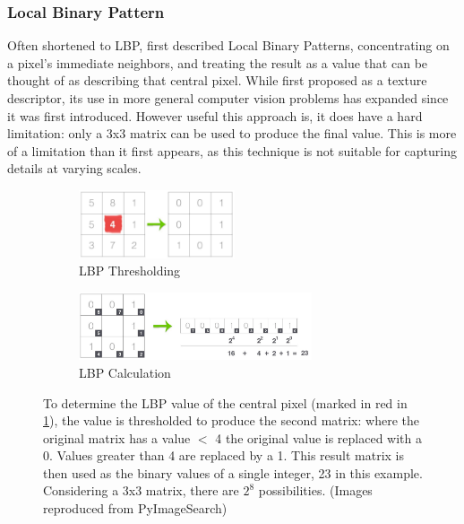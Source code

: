 \documentclass[letterpaper]{article}
\begin{document}
{\subsubsection{Local Binary Pattern}
Often shortened to LBP, \citeauthor{Ojala1996-ps} first described Local Binary Patterns, concentrating on a pixel's immediate neighbors, and treating the result as a value that can be thought of as describing that central pixel. While first proposed as a texture descriptor, its use in more general computer vision problems has expanded since it was first introduced. However useful this approach is, it does have a hard limitation: only a 3x3 matrix can be used to produce the final value. This is more of a limitation than it first appears, as this technique is not suitable for capturing details at varying scales.

\begin{figure}[H]
	\begin{subfigure}[h]{0.48\linewidth}
		\centering
		\includegraphics[height=2cm]{./figures/lbp_thresholding.jpg}
		\caption{LBP Thresholding}
		\label{subfig:lbp-thresholding}	
	\end{subfigure}
	\hfill
	\begin{subfigure}[h]{0.48\linewidth}
		\centering
		\includegraphics[height=2cm]{./figures/lbp_calculation.jpg}
		\caption{LBP Calculation}
		\label{subfig:lbp-calculation}		
	\end{subfigure}%
	\caption[Local Binary Pattern thresholding and calculation]{To determine the LBP value of the central pixel (marked in red in \ref{subfig:lbp-thresholding}), the value is thresholded to produce the second matrix: where the original matrix has a value $<$ 4 the original value is replaced with a 0. Values greater than 4 are replaced by a 1. This result matrix is then used as the binary values of a single integer, 23 in this example. Considering a 3x3 matrix, there are $2^8$ possibilities. (Images reproduced from PyImageSearch)}
	\label{fig:lbp}
\end{figure}

}
\end{document}
